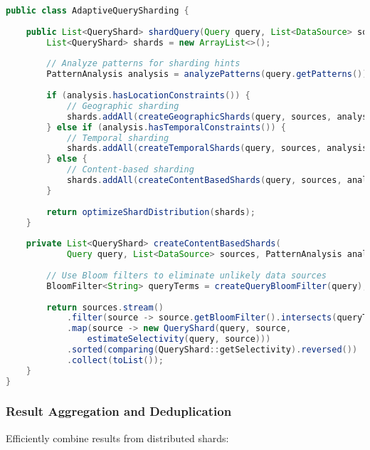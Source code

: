 \documentclass[11pt,a4paper]{article}
\begin{document}
\begin{lstlisting}[language=Java, caption=Adaptive Query Sharding]
public class AdaptiveQuerySharding {
    
    public List<QueryShard> shardQuery(Query query, List<DataSource> sources) {
        List<QueryShard> shards = new ArrayList<>();
        
        // Analyze patterns for sharding hints
        PatternAnalysis analysis = analyzePatterns(query.getPatterns());
        
        if (analysis.hasLocationConstraints()) {
            // Geographic sharding
            shards.addAll(createGeographicShards(query, sources, analysis));
        } else if (analysis.hasTemporalConstraints()) {
            // Temporal sharding
            shards.addAll(createTemporalShards(query, sources, analysis));
        } else {
            // Content-based sharding
            shards.addAll(createContentBasedShards(query, sources, analysis));
        }
        
        return optimizeShardDistribution(shards);
    }
    
    private List<QueryShard> createContentBasedShards(
            Query query, List<DataSource> sources, PatternAnalysis analysis) {
        
        // Use Bloom filters to eliminate unlikely data sources
        BloomFilter<String> queryTerms = createQueryBloomFilter(query);
        
        return sources.stream()
            .filter(source -> source.getBloomFilter().intersects(queryTerms))
            .map(source -> new QueryShard(query, source, 
                estimateSelectivity(query, source)))
            .sorted(comparing(QueryShard::getSelectivity).reversed())
            .collect(toList());
    }
}
\end{lstlisting}

\subsubsection{Result Aggregation and Deduplication}

Efficiently combine results from distributed shards:
\end{document}
